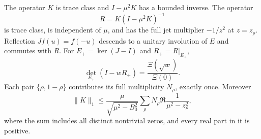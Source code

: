 \begin{proposition}
The operator $K$ is trace class and $I-\mu^2K$ has a bounded inverse. The operator
\[
 R=K(I-\mu^2K)^{-1}
\]
is trace class, is independent of $\mu$, and has the full jet multiplier $-1/z^2$ at $z=z_\rho$. Reflection $Jf(u)=f(-u)$ descends to a unitary involution of $E$ and commutes with $R$. For $E_+=\ker(J-I)$ and $R_+=R|_{E_+}$,
\begin{equation}\label{eq:masactualXi}
 \det_{E_+}(I-wR_+)=\frac{\Xi(\sqrt w)}{\Xi(0)}.
\end{equation}
Each pair $\{\rho,1-\rho\}$ contributes its full multiplicity $N_\rho$, exactly once. Moreover
\begin{equation}\label{eq:masGreennorm}
 \|K\|_1\le\frac{\mu}{\sqrt{\mu^2-B_0^2}}
 \sum_\rho N_\rho\Re\frac1{\mu^2-z_\rho^2},
\end{equation}
where the sum includes all distinct nontrivial zeros, and every real part in it is positive.
\end{proposition}
